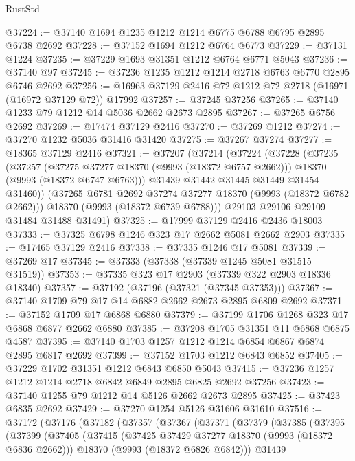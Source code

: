 \begin{lexlean}{RustStd}
\begin{coremodule}
@37224 := @37140 @1694 @1235 @1212 @1214 @6775 @6788 @6795 @2895 @6738 @2692
@37228 := @37152 @1694 @1212 @6764 @6773
@37229 := @37131 @1224
@37235 := @37229 @1693 @31351 @1212 @6764 @6771 @5043
@37236 := @37140 @97
@37245 := @37236 @1235 @1212 @1214 @2718 @6763 @6770 @2895 @6746 @2692
@37256 := @16963 @37129 @2416 @72 @1212 @72 @2718 (@16971 (@16972 @37129 @72)) @17992
@37257 := @37245 @37256
@37265 := @37140 @1233 @79 @1212 @14 @5036 @2662 @2673 @2895
@37267 := @37265 @6756 @2692
@37269 := @17474 @37129 @2416
@37270 := @37269 @1212
@37274 := @37270 @1232 @5036 @31416 @31420
@37275 := @37267 @37274
@37277 := @18365 @37129 @2416
@37321 := @37207
    (@37214
      (@37224
        (@37228
          (@37235
            (@37257
              (@37275 @37277 @18370 (@9993 (@18372 @6757 @2662)))
              @18370
              (@9993 (@18372 @6747 @6763)))
            @31439
            @31442
            @31445
            @31449
            @31454
            @31460))
        (@37265 @6781 @2692 @37274 @37277 @18370 (@9993 (@18372 @6782 @2662)))
        @18370
        (@9993 (@18372 @6739 @6788)))
      @29103
      @29106
      @29109
      @31484
      @31488
      @31491)
@37325 := @17999 @37129 @2416 @2436 @18003
@37333 := @37325 @6798 @1246 @323 @17 @2662 @5081 @2662 @2903
@37335 := @17465 @37129 @2416
@37338 := @37335 @1246 @17 @5081
@37339 := @37269 @17
@37345 := @37333 (@37338 (@37339 @1245 @5081 @31515 @31519))
@37353 := @37335 @323 @17 @2903 (@37339 @322 @2903 @18336 @18340)
@37357 := @37192 (@37196 (@37321 (@37345 @37353)))
@37367 := @37140 @1709 @79 @17 @14 @6882 @2662 @2673 @2895 @6809 @2692
@37371 := @37152 @1709 @17 @6868 @6880
@37379 := @37199 @1706 @1268 @323 @17 @6868 @6877 @2662 @6880
@37385 := @37208 @1705 @31351 @11 @6868 @6875 @4587
@37395 := @37140 @1703 @1257 @1212 @1214 @6854 @6867 @6874 @2895 @6817 @2692
@37399 := @37152 @1703 @1212 @6843 @6852
@37405 := @37229 @1702 @31351 @1212 @6843 @6850 @5043
@37415 := @37236 @1257 @1212 @1214 @2718 @6842 @6849 @2895 @6825 @2692 @37256
@37423 := @37140 @1255 @79 @1212 @14 @5126 @2662 @2673 @2895
@37425 := @37423 @6835 @2692
@37429 := @37270 @1254 @5126 @31606 @31610
@37516 := @37172
    (@37176
      (@37182
        (@37357
          (@37367
            (@37371
              (@37379
                (@37385
                  (@37395
                    (@37399
                      (@37405
                        (@37415
                          (@37425 @37429 @37277 @18370 (@9993 (@18372 @6836 @2662)))
                          @18370
                          (@9993 (@18372 @6826 @6842)))
                        @31439

\end{coremodule}
\end{lexlean}

